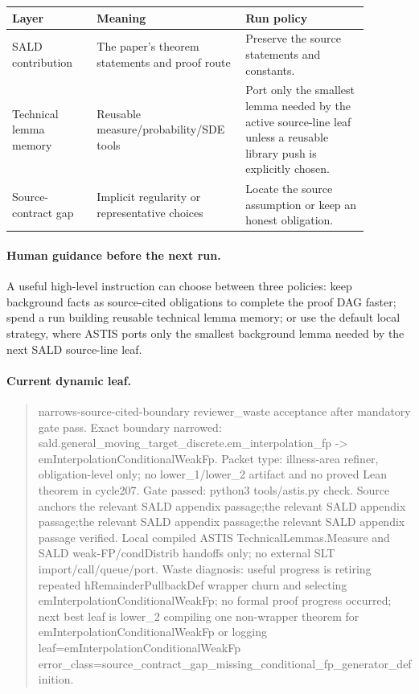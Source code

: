 \begin{center}
\begin{tabular}{p{0.22\linewidth}p{0.34\linewidth}p{0.32\linewidth}}
\toprule
Layer & Meaning & Run policy \\
\midrule
SALD contribution & The paper's theorem statements and proof route & Preserve
the source statements and constants. \\
Technical lemma memory & Reusable measure/probability/SDE tools & Port only
the smallest lemma needed by the active source-line leaf unless a reusable
library push is explicitly chosen. \\
Source-contract gap & Implicit regularity or representative choices & Locate
the source assumption or keep an honest obligation. \\
\bottomrule
\end{tabular}
\end{center}

\paragraph{Human guidance before the next run.}
A useful high-level instruction can choose between three policies: keep
background facts as source-cited obligations to complete the proof DAG faster;
spend a run building reusable technical lemma memory; or use the default local
strategy, where ASTIS ports only the smallest background lemma needed by the
next SALD source-line leaf.

\paragraph{Current dynamic leaf.}
\begin{quote}\small
narrows-source-cited-boundary reviewer\_waste acceptance after mandatory gate pass. Exact boundary narrowed: sald.general\_moving\_target\_discrete.em\_interpolation\_fp -> emInterpolationConditionalWeakFp. Packet type: illness-area refiner, obligation-level only; no lower\_1/lower\_2 artifact and no proved Lean theorem in cycle207. Gate passed: python3 tools/astis.py check. Source anchors the relevant SALD appendix passage;the relevant SALD appendix passage;the relevant SALD appendix passage;the relevant SALD appendix passage verified. Local compiled ASTIS TechnicalLemmas.Measure and SALD weak-FP/condDistrib handoffs only; no external SLT import/call/queue/port. Waste diagnosis: useful progress is retiring repeated hRemainderPullbackDef wrapper churn and selecting emInterpolationConditionalWeakFp; no formal proof progress occurred; next best leaf is lower\_2 compiling one non-wrapper theorem for emInterpolationConditionalWeakFp or logging leaf=emInterpolationConditionalWeakFp error\_class=source\_contract\_gap\_missing\_conditional\_fp\_generator\_definition.
\end{quote}

